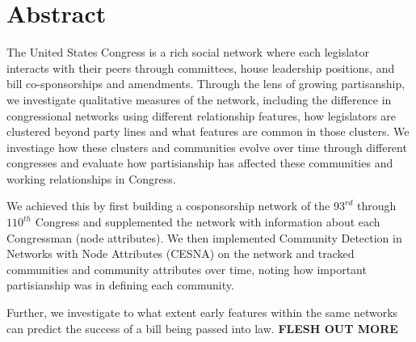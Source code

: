\section{Abstract}

The United States Congress is a rich social network where each legislator
interacts with their peers through committees, house leadership positions, and
bill co-sponsorships and amendments. Through the lens of growing partisanship,
we investigate qualitative measures of the network, including the difference in
congressional networks using different relationship features, how legislators
are clustered beyond party lines and what features are common in those clusters.
We investiage how these clusters and communities evolve over time through
different congresses and evaluate how partisianship has affected these
communities and working relationships in Congress.

We achieved this by first building a cosponsorship network of the $93^{rd}$
through $110^{th}$ Congress and supplemented the network with information about
each Congressman (node attributes). We then implemented Community Detection in
Networks with Node Attributes (CESNA) on the network and tracked communities and
community attributes over time, noting how important partisianship was in
defining each community.

Further, we investigate to what extent early features within the same networks
can predict the success of a bill being passed into law. \textbf{FLESH OUT MORE}
